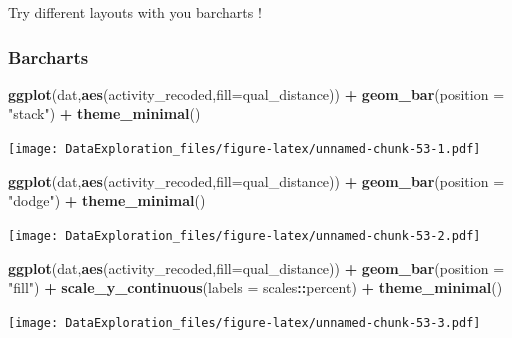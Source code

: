 \documentclass[
]{book}
\newenvironment{Shaded}{\begin{snugshade}}{\end{snugshade}}
\newcommand{\DataTypeTok}[1]{\textcolor[rgb]{0.13,0.29,0.53}{#1}}
\newcommand{\KeywordTok}[1]{\textcolor[rgb]{0.13,0.29,0.53}{\textbf{#1}}}
\newcommand{\NormalTok}[1]{#1}
\newcommand{\OperatorTok}[1]{\textcolor[rgb]{0.81,0.36,0.00}{\textbf{#1}}}
\newcommand{\StringTok}[1]{\textcolor[rgb]{0.31,0.60,0.02}{#1}}
\begin{document}
Try different layouts with you barcharts !

\hypertarget{barcharts-1}{%
\subsubsection{Barcharts}\label{barcharts-1}}

\begin{Shaded}
\begin{Highlighting}[]
\KeywordTok{ggplot}\NormalTok{(dat,}\KeywordTok{aes}\NormalTok{(activity_recoded,}\DataTypeTok{fill=}\NormalTok{qual_distance)) }\OperatorTok{+}\StringTok{ }
\StringTok{  }\KeywordTok{geom_bar}\NormalTok{(}\DataTypeTok{position =} \StringTok{"stack"}\NormalTok{) }\OperatorTok{+}\StringTok{ }\KeywordTok{theme_minimal}\NormalTok{()}
\end{Highlighting}
\end{Shaded}

\texttt{[image: DataExploration\_files/figure-latex/unnamed-chunk-53-1.pdf]}

\begin{Shaded}
\begin{Highlighting}[]
\KeywordTok{ggplot}\NormalTok{(dat,}\KeywordTok{aes}\NormalTok{(activity_recoded,}\DataTypeTok{fill=}\NormalTok{qual_distance)) }\OperatorTok{+}\StringTok{ }
\StringTok{  }\KeywordTok{geom_bar}\NormalTok{(}\DataTypeTok{position =} \StringTok{"dodge"}\NormalTok{) }\OperatorTok{+}\StringTok{ }\KeywordTok{theme_minimal}\NormalTok{()}
\end{Highlighting}
\end{Shaded}

\texttt{[image: DataExploration\_files/figure-latex/unnamed-chunk-53-2.pdf]}

\begin{Shaded}
\begin{Highlighting}[]
\KeywordTok{ggplot}\NormalTok{(dat,}\KeywordTok{aes}\NormalTok{(activity_recoded,}\DataTypeTok{fill=}\NormalTok{qual_distance)) }\OperatorTok{+}\StringTok{ }
\StringTok{  }\KeywordTok{geom_bar}\NormalTok{(}\DataTypeTok{position =} \StringTok{"fill"}\NormalTok{) }\OperatorTok{+}\StringTok{ }
\StringTok{  }\KeywordTok{scale_y_continuous}\NormalTok{(}\DataTypeTok{labels =}\NormalTok{ scales}\OperatorTok{::}\NormalTok{percent) }\OperatorTok{+}\StringTok{ }\KeywordTok{theme_minimal}\NormalTok{()}
\end{Highlighting}
\end{Shaded}

\texttt{[image: DataExploration\_files/figure-latex/unnamed-chunk-53-3.pdf]}
\end{document}
